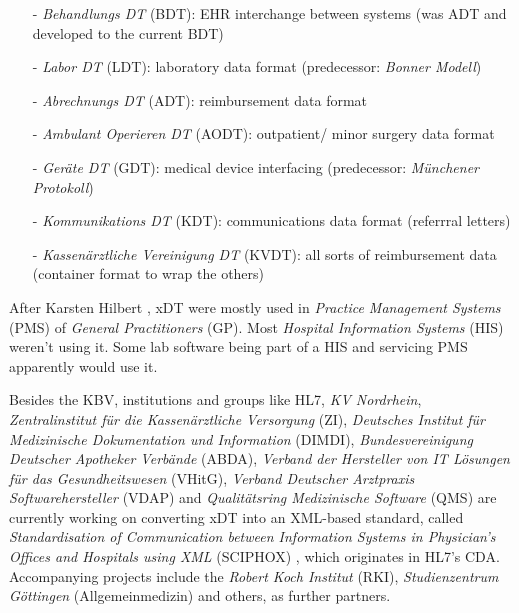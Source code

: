\begin{itemize}
    \item[-] \emph{Behandlungs DT} (BDT): EHR interchange between systems
        (was ADT and developed to the current BDT)
    \item[-] \emph{Labor DT} (LDT): laboratory data format
        (predecessor: \emph{Bonner Modell})
    \item[-] \emph{Abrechnungs DT} (ADT): reimbursement data format
    \item[-] \emph{Ambulant Operieren DT} (AODT): outpatient/ minor surgery
        data format
    \item[-] \emph{Ger\"{a}te DT} (GDT): medical device interfacing
        (predecessor: \emph{M\"{u}nchener Protokoll})
    \item[-] \emph{Kommunikations DT} (KDT): communications data format
        (referrral letters)
    \item[-] \emph{Kassen\"{a}rztliche Vereinigung DT} (KVDT): all sorts of
        reimbursement data (container format to wrap the others)
\end{itemize}

After Karsten Hilbert \cite{openhealth}, xDT were mostly used in
\emph{Practice Management Systems} (PMS) of \emph{General Practitioners} (GP).
Most \emph{Hospital Information Systems} (HIS) weren't using it. Some lab
software being part of a HIS and servicing PMS apparently would use it.

Besides the KBV, institutions and groups like HL7, \emph{KV Nordrhein},
\emph{Zentralinstitut f\"{u}r die Kassen\"{a}rztliche Versorgung} (ZI),
\emph{Deutsches Institut f\"{u}r Medizinische Dokumentation und Information}
(DIMDI), \emph{Bundesvereinigung Deutscher Apotheker Verb\"{a}nde} (ABDA),
\emph{Verband der Hersteller von IT L\"{o}sungen f\"{u}r das Gesundheitswesen}
(VHitG), \emph{Verband Deutscher Arztpraxis Softwarehersteller} (VDAP) and
\emph{Qualit\"{a}tsring Medizinische Software} (QMS) are currently working on
converting xDT into an XML-based standard, called \emph{Standardisation of
Communication between Information Systems in Physician's Offices and Hospitals
using XML} (SCIPHOX) \cite{sciphox}, which originates in HL7's CDA. Accompanying
projects \cite{medvip} include the \emph{Robert Koch Institut} (RKI),
\emph{Studienzentrum G\"{o}ttingen} (Allgemeinmedizin) and others, as further
partners.
